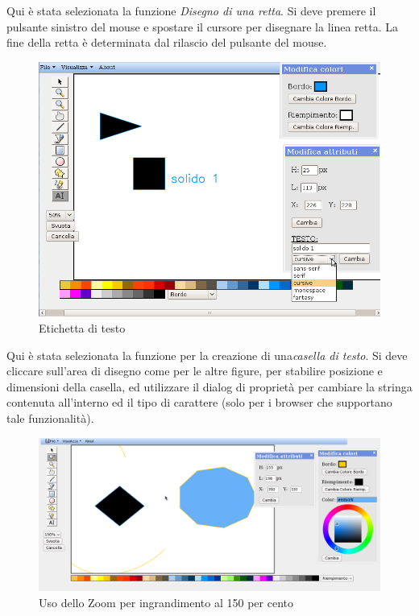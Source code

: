 \vspace{300pt}
Qui \`e stata selezionata la funzione \textit{Disegno di una retta}. Si deve premere il pulsante sinistro del mouse e spostare il cursore per disegnare la linea retta. La fine della retta \`e determinata dal rilascio del pulsante del mouse.

\begin{figure}[!ht]
\centering
\includegraphics[scale=0.5]{images/label.png}
\caption{Etichetta di testo}
\end{figure} 

\vspace{300pt}
Qui \`e stata selezionata la funzione per la creazione di una\textit{casella di testo}. Si deve cliccare sull'area di disegno come per le altre figure, per stabilire posizione e dimensioni della casella,  ed utilizzare il dialog di propriet\`a per cambiare la stringa contenuta all'interno ed il tipo di carattere (solo per i browser che supportano tale funzionalit\` a).
 
\begin{figure}[!ht]
\centering
\includegraphics[scale=0.4]{images/zoom_piu.png}
\caption{Uso dello Zoom per ingrandimento al 150 per cento}
\end{figure} 

